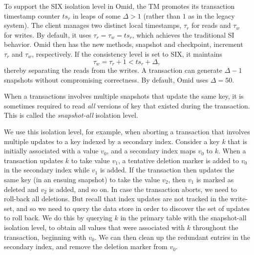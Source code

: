 To support the SIX isolation level in Omid, the TM promotes its transaction timestamp counter $ts_r$ 
in leaps of some $\Delta > 1$ (rather than $1$ as in the legacy system).  The client manages 
two distinct local timestamps, $\tau_r$ for reads and $\tau_w$ for writes. By default, 
it uses  $\tau_r = \tau_w = ts_r$, which achieves the traditional SI behavior. Omid 
then has the new methods, snapshot and checkpoint, increment 
$\tau_r$ and $\tau_w$, respectively. If the consistency level is set to SIX, 
it maintains 
\[
\tau_w = \tau_r+1 < ts_r+\Delta,
\]
thereby separating the reads from the writes. 
A transaction can generate $\Delta-1$ snapshots without compromising
 correctness. By default, Omid uses $\Delta=50$.  

When a transactions involves multiple snapshots that update the same key, 
it is sometimes required to read \emph{all} versions of key that existed 
during the transaction. This is called the \emph{snapshot-all} isolation level.

We use this isolation level, for example, when aborting a transaction that 
involves multiple updates to a key indexed by a secondary index. 
Consider a key $k$ that is initially associated with a value $v_0$, 
and a secondary index maps $v_0$ to $k$. 
When a transaction updates $k$ to take value $v_1$, a tentative deletion marker
is added to $v_0$ in the secondary index while $v_1$ is added. 
If the transaction then updates 
the same key (in an ensuing snapshot) to take the value $v_2$, 
then $v_1$ is marked as deleted and $v_2$ is added, and so on. 
In case the transaction aborts, we need to roll-back all deletions. 
But recall that index updates are not tracked in the write-set,
and so we need to query the data store in order to discover the set
of updates to roll back. We do this by querying $k$ in the primary table
with the snapshot-all isolation level, to obtain all values 
that were associated with $k$ throughout the transaction, beginning with $v_0$.
We can then clean up the redundant entries in the secondary index, and 
remove the deletion marker from $v_0$.
 
